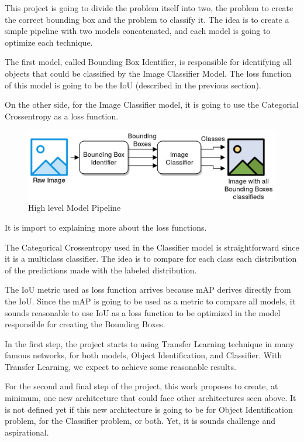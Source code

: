 \documentclass[11pt, a4paper, twocolumn]{article}
\begin{document}
This project is going to divide the problem itself into two, the problem to create the correct bounding box and the problem to classify it. The idea is to create a simple pipeline with two models concatenated, and each model is going to optimize each technique.

The first model, called Bounding Box Identifier, is responsible for identifying all objects that could be classified by the Image Classifier Model. The loss function of this model is going to be the IoU (described in the previous section).

On the other side, for the Image Classifier model, it is going to use the Categorial Crossentropy as a loss function.

\begin{figure}[ht]
	\centering
	\includegraphics[width=.55\textwidth]{high-level-architecture.jpg}
	\caption{\scriptsize High level Model Pipeline}
\end{figure}

It is import to explaining more about the loss functions. 

The Categorical Crossentropy used in the Classifier model is straightforward since it is a multiclass classifier. The idea is to compare for each class each distribution of the predictions made with the labeled distribution.

The IoU metric used as loss function arrives because mAP derives directly from the IoU. Since the mAP is going to be used as a metric to compare all models, it sounds reasonable to use IoU as a loss function to be optimized in the model responsible for creating the Bounding Boxes.

In the first step, the project starts to using Transfer Learning technique in many famous networks, for both models, Object Identification, and Classifier. With Transfer Learning, we expect to achieve some reasonable results.

For the second and final step of the project, this work proposes to create, at minimum, one new architecture that could face other architectures seen above. It is not defined yet if this new architecture is going to be for Object Identification problem, for the Classifier problem, or both. Yet, it is sounds challenge and aspirational.

 


{}
\end{document}
